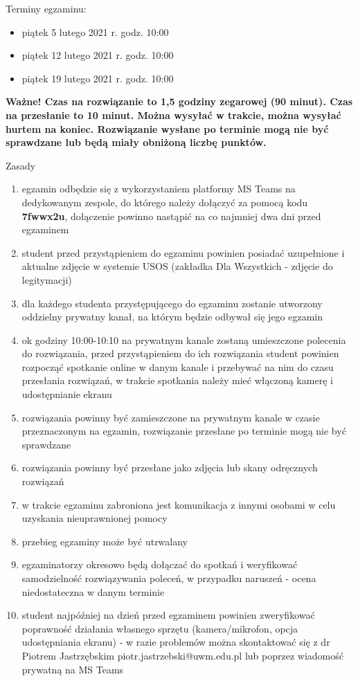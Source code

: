 \documentclass[12pt]{article}
\begin{document}
\Large{
Terminy egzaminu:

\begin{itemize}
\item piątek 5 lutego 2021 r. godz. 10:00
\item piątek 12 lutego 2021 r. godz. 10:00
\item piątek 19 lutego 2021 r. godz. 10:00
\end{itemize}
}

\textbf{Ważne! Czas na rozwiązanie to 1,5 godziny zegarowej (90 minut). Czas na przesłanie to 10 minut. Można wysyłać w trakcie, można wysyłać hurtem na koniec. Rozwiązanie wysłane po terminie mogą nie być sprawdzane lub będą miały obniżoną liczbę punktów. }

\normalsize
Zasady
\begin{enumerate}
\item egzamin odbędzie się z wykorzystaniem platformy MS Teams na dedykowanym zespole, do którego należy dołączyć za pomocą kodu \textbf{7fwwx2u}, dołączenie powinno nastąpić na co najmniej dwa dni przed egzaminem
\item student przed przystąpieniem do egzaminu powinien posiadać uzupełnione i aktualne zdjęcie w systemie USOS (zakładka Dla Wszystkich - zdjęcie do legitymacji)
\item dla każdego studenta przystępującego do egzaminu zostanie utworzony oddzielny prywatny kanał, na którym będzie odbywał się jego egzamin
\item ok godziny 10:00-10:10 na prywatnym kanale zostaną umieszczone polecenia do rozwiązania, przed przystąpieniem do ich rozwiązania student powinien rozpocząć spotkanie online w danym kanale i przebywać na nim do czasu przesłania rozwiązań, w trakcie spotkania należy mieć włączoną kamerę i udostępnianie ekranu
\item rozwiązania powinny być zamieszczone na prywatnym kanale w czasie przeznaczonym na egzamin, rozwiązanie przesłane po terminie mogą nie być sprawdzane
\item rozwiązania powinny być przesłane jako zdjęcia lub skany odręcznych rozwiązań
\item w trakcie egzaminu zabroniona jest komunikacja z innymi osobami w celu uzyskania nieuprawnionej pomocy
\item przebieg egzaminy może być utrwalany
\item egzaminatorzy okresowo będą dołączać do spotkań i weryfikować samodzielność rozwiązywania poleceń, w przypadku naruszeń - ocena niedostateczna w danym terminie
\item student najpóźniej na dzień przed egzaminem powinien zweryfikować poprawność działania własnego sprzętu (kamera/mikrofon, opcja udostępniania ekranu) - w razie problemów można skontaktować się z dr Piotrem Jastrzębskim piotr.jastrzebski@uwm.edu.pl lub poprzez wiadomość prywatną na MS Teams
\end{enumerate}
\end{document}
